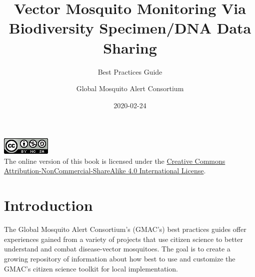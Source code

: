 \documentclass[]{article}
\title{Vector Mosquito Monitoring Via Biodiversity Specimen/DNA Data Sharing}
\subtitle{Best Practices Guide}
\author{Global Mosquito Alert Consortium}
\date{2020-02-24}
\begin{document}
\maketitle

{
\setcounter{tocdepth}{2}
\tableofcontents
}
\hypertarget{section}{%
\section*{}\label{section}}

\includegraphics{images/by-nc-sa.png}\\
The online version of this book is licensed under the \href{http://creativecommons.org/licenses/by-nc-sa/4.0/}{Creative Commons Attribution-NonCommercial-ShareAlike 4.0 International License}.

\hypertarget{intro}{%
\section{Introduction}\label{intro}}

The Global Mosquito Alert Consortium's (GMAC's) best practices guides offer experiences gained from a variety of projects that use citizen science to better understand and combat disease-vector mosquitoes. The goal is to create a growing repository of information about how best to use and customize the GMAC's citizen science toolkit for local implementation.
\end{document}
